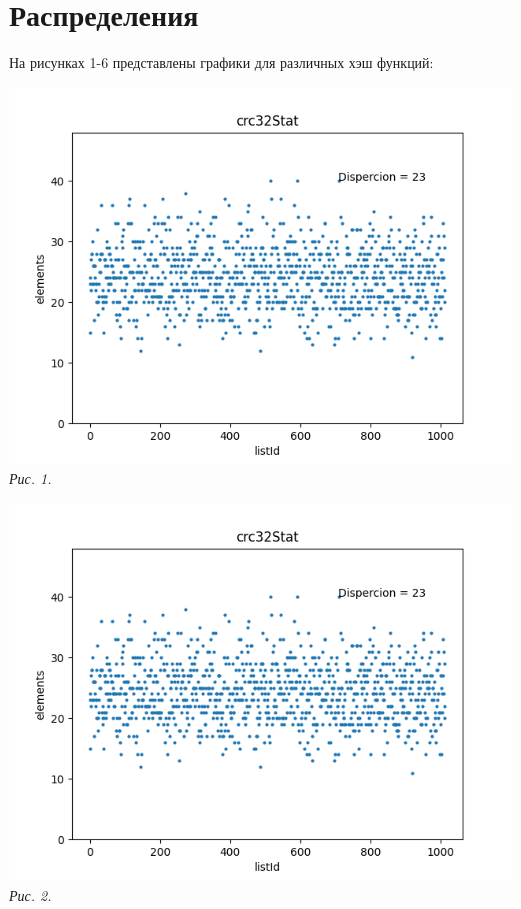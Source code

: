 
\section{ Распределения }
На рисунках 1-6 представлены графики для различных хэш функций:

\noindent\begin{minipage}[h!]{0.45\linewidth}
    \begin{center}
        \includegraphics[width = 1\linewidth]{picks/crc32Stat.png} \\
        \textit{Рис. 1. }
    \end{center} 
\end{minipage}
\begin{minipage}[h!]{0.45\linewidth}
    \begin{center}
        \includegraphics[width = 1\linewidth]{picks/crc32Stat.png} \\
        \textit{Рис. 2. }
    \end{center} 
\end{minipage}

